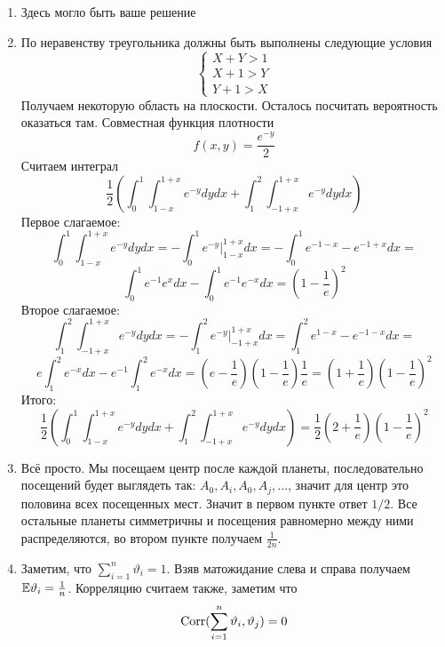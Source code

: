 \documentclass[12pt, a4paper]{article}\usepackage[]{graphicx}\usepackage[]{color}
\begin{document}
						\begin{enumerate}
							\item Здесь могло быть ваше решение
							\item По неравенству треугольника должны быть выполнены следующие условия
							\begin{equation}
							\begin{cases}
							X + Y > 1 \\
							X + 1 > Y \\
							Y  + 1 > X
							\end{cases}
							\end{equation}
							Получаем некоторую область на плоскости. Осталось посчитать вероятность оказаться там. Совместная функция плотности
							\[
							f(x, y) = \frac{e^{-y}}{2}
							\]
							Считаем интеграл
							\[
							\frac{1}{2}\left(  \int_{0}^1 \int_{1 - x}^{1 + x} e^{-y} dy dx  + \int_{1}^2 \int_{-1 + x}^{1 + x}  e^{-y} dy dx  \right)
							\]
							Первое слагаемое:
							\[
							\int_{0}^1 \int_{1 - x}^{1 + x} e^{-y} dy dx = - \int_{0}^1 e^{-y} |_{1 - x}^{1 + x} dx = - \int_{0}^1 e^{-1 - x} - e^{- 1 + x} dx =
							\]
							\[
							\int_0^1 e^{-1} e^x dx - \int_{0}^1 e^{-1} e^{-x} dx = \left(1 -  \frac{1}{e}\right)^2
							\]
							Второе слагаемое:
							\[
							\int_{1}^2 \int_{-1 + x}^{1 + x}  e^{-y} dy dx = - \int_{1}^2 e^{-y} |_{-1 + x}^{1 + x} dx = \int_1^2 e^{1 - x} - e^{- 1 - x} dx =
							\]
							\[
							e \int_1^2 e^{-x} dx - e^{-1} \int_1^2 e^{-x} dx = \left( e - \frac{1}{e}\right) \left( 1 - \frac{1}{e} \right) \frac{1}{e}  = \left( 1 + \frac{1}{e} \right) \left(1 -  \frac{1}{e}\right)^2
							\]
							Итого:
							\[
							\frac{1}{2}\left(  \int_{0}^1 \int_{1 - x}^{1 + x} e^{-y} dy dx  + \int_{1}^2 \int_{-1 + x}^{1 + x}  e^{-y} dy dx  \right) = \frac{1}{2}  \left( 2 + \frac{1}{e} \right) \left(1 -  \frac{1}{e}\right)^2
							\]
							\item Всё просто. Мы посещаем центр после каждой планеты, последовательно посещений будет выглядеть так: $A_0, A_i, A_0, A_j, \ldots$, значит для центр это половина всех посещенных мест. Значит в первом пункте ответ $1/2$. Все остальные планеты  симметричны и посещения равномерно между ними распределяются, во втором пункте получаем $\frac{1}{2n}$.
							\item Заметим, что $\sum_{i = 1}^n \vartheta_i = 1$. Взяв матожидание слева и справа получаем $\mathbb{E} \vartheta_i = \frac{1}{n}$. Корреляцию считаем также, заметим что
							\[
							\operatorname{Corr} (\sum_{i = 1}^n \vartheta_i, \vartheta_j) = 0
\]
\end{enumerate}
\end{document}
